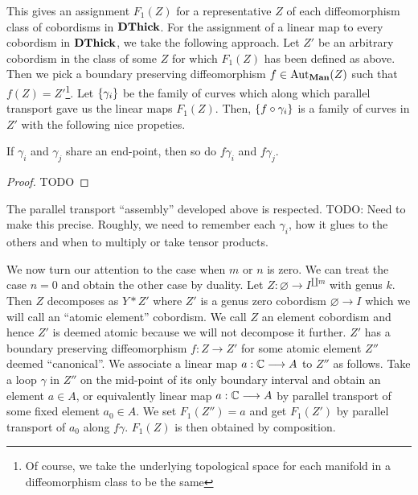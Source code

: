 \documentclass[./Thick_TQFTs_and_Quantum_Information.tex]{subfiles}
\begin{document}
This gives an assignment $F_1(Z)$ for a representative $Z$ of each
diffeomorphism class of cobordisms in $\textbf{DThick}$. For the assignment of a linear
map to every cobordism in $\textbf{DThick}$, we take the following approach. Let $Z'$
be an arbitrary cobordism in the class of some $Z$ for which $F_1(Z)$ has been
defined as above. Then we pick a boundary preserving diffeomorphism
$f \in \text{Aut}_{\textbf{Man}}(Z)$ such that $f(Z) = Z'$\footnote{Of course, we take the
underlying topological space for each manifold in a diffeomorphism class to be
the same}. Let $\set{\gamma_i}$ be the family of curves which along which
parallel transport gave us the linear maps $F_1(Z)$. Then,
$\set{f \circ \gamma_i}$ is a family of curves in $Z'$ with the following nice
propeties.
\begin{thm}
If $\gamma_i$ and $\gamma_j$ share an end-point, then so do $f\gamma_i$ and
$f\gamma_j$.
\end{thm}
\begin{proof}
{\color{blue!55!black} TODO}
\end{proof}

\begin{thm}
The parallel transport ``assembly'' developed above is respected.
{\color{blue!55!black} TODO: Need to make this precise. Roughly, we need to
remember each $\gamma_i$, how it glues to the others and when to multiply or
take tensor products.}
\end{thm}

We now turn our attention to the case when $m$ or $n$ is zero. We can treat the
case $n = 0$ and obtain the other case by duality. Let
$Z : \varnothing \to I^{\amalg m}$ with genus $k$. Then $Z$ decomposes as
$Y * Z'$ where $Z'$ is a genus zero cobordism $\varnothing \to I$ which we will
call an ``atomic element'' cobordism. We call $Z$ an element cobordism and hence
$Z'$ is deemed atomic because we will not decompose it further. $Z'$ has a
boundary preserving diffeomorphism $f : Z \to Z'$ for some atomic
element $Z''$ deemed ``canonical''. We associate a linear map $a : \mathbb{C} \stackrel{}{\longrightarrow} A$ to
$Z''$ as follows. Take a loop $\gamma$ in $Z''$ on the mid-point of its only
boundary interval and obtain an element $a \in A$, or equivalently linear map
$a : \mathbb{C} \stackrel{}{\longrightarrow} A$ by parallel transport of some fixed element $a_0 \in A$. We set
$F_1(Z'') = a$ and get $F_1(Z')$ by parallel transport of $a_0$ along $f\gamma$.
$F_1(Z)$ is then obtained by composition.
\end{document}
